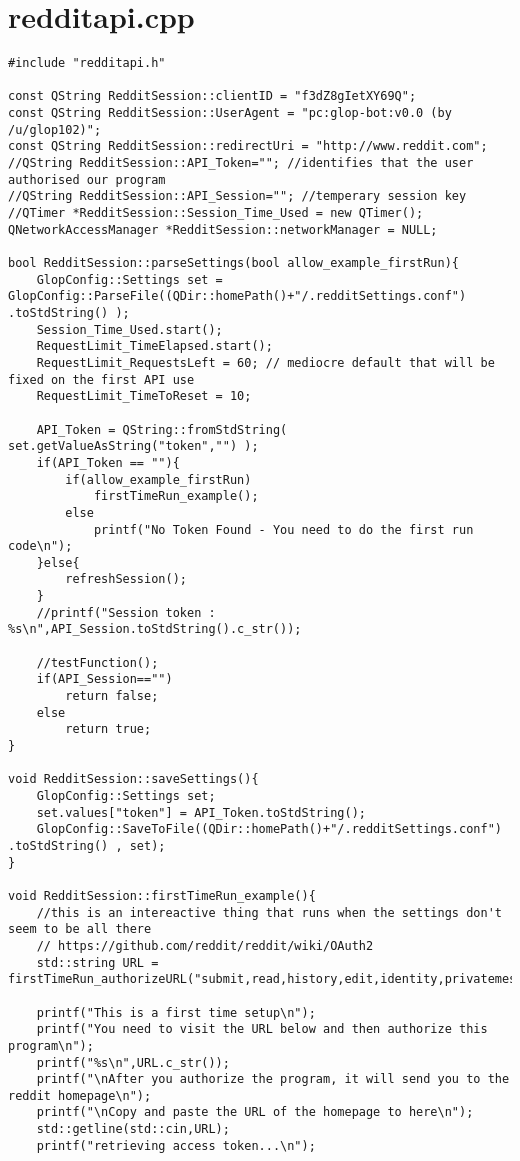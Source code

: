 \documentclass[12pt]{article}
\begin{document}
\clearpage
\section{redditapi.cpp}
\begin{verbatim}
#include "redditapi.h"

const QString RedditSession::clientID = "f3dZ8gIetXY69Q";
const QString RedditSession::UserAgent = "pc:glop-bot:v0.0 (by /u/glop102)";
const QString RedditSession::redirectUri = "http://www.reddit.com";
//QString RedditSession::API_Token=""; //identifies that the user authorised our program
//QString RedditSession::API_Session=""; //temperary session key
//QTimer *RedditSession::Session_Time_Used = new QTimer();
QNetworkAccessManager *RedditSession::networkManager = NULL;

bool RedditSession::parseSettings(bool allow_example_firstRun){
	GlopConfig::Settings set = GlopConfig::ParseFile((QDir::homePath()+"/.redditSettings.conf") .toStdString() );
	Session_Time_Used.start();
	RequestLimit_TimeElapsed.start();
	RequestLimit_RequestsLeft = 60; // mediocre default that will be fixed on the first API use
	RequestLimit_TimeToReset = 10;

	API_Token = QString::fromStdString( set.getValueAsString("token","") );
	if(API_Token == ""){
		if(allow_example_firstRun)
			firstTimeRun_example();
		else
			printf("No Token Found - You need to do the first run code\n");
	}else{
		refreshSession();
	}
	//printf("Session token : %s\n",API_Session.toStdString().c_str());

	//testFunction();
	if(API_Session=="")
		return false;
	else
		return true;
}

void RedditSession::saveSettings(){
	GlopConfig::Settings set;
	set.values["token"] = API_Token.toStdString();
	GlopConfig::SaveToFile((QDir::homePath()+"/.redditSettings.conf") .toStdString() , set);
}

void RedditSession::firstTimeRun_example(){
	//this is an intereactive thing that runs when the settings don't seem to be all there
	// https://github.com/reddit/reddit/wiki/OAuth2
	std::string URL = firstTimeRun_authorizeURL("submit,read,history,edit,identity,privatemessages").toStdString();

	printf("This is a first time setup\n");
	printf("You need to visit the URL below and then authorize this program\n");
	printf("%s\n",URL.c_str());
	printf("\nAfter you authorize the program, it will send you to the reddit homepage\n");
	printf("\nCopy and paste the URL of the homepage to here\n");
	std::getline(std::cin,URL);
	printf("retrieving access token...\n");


\end{verbatim}
\end{document}
